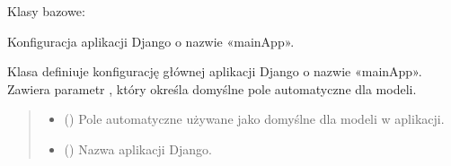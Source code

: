 \documentclass[letterpaper,10pt,polish]{sphinxmanual}
\begin{document}
\begin{fulllineitems}
\label{\detokenize{mainApp:mainApp.apps.MainappConfig}}
\pysigstartsignatures
{}
\pysigstopsignatures
\sphinxAtStartPar
Klasy bazowe: 

\sphinxAtStartPar
Konfiguracja aplikacji Django o nazwie «mainApp».

\sphinxAtStartPar
Klasa  definiuje konfigurację głównej aplikacji Django o nazwie «mainApp».
Zawiera parametr , który określa domyślne pole automatyczne dla modeli.
\begin{quote}\begin{description}
\begin{itemize}
\item {} 
\sphinxAtStartPar
{} () \textendash{} Pole automatyczne używane jako domyślne dla modeli w aplikacji.

\item {} 
\sphinxAtStartPar
{} () \textendash{} Nazwa aplikacji Django.

\end{itemize}

\end{description}\end{quote}

\begin{fulllineitems}
\label{\detokenize{mainApp:mainApp.apps.MainappConfig.default_auto_field}}
\pysigstartsignatures
{}
\pysigstopsignatures
\end{fulllineitems}


\begin{fulllineitems}
\label{\detokenize{mainApp:mainApp.apps.MainappConfig.name}}
\pysigstartsignatures
{}
\pysigstopsignatures
\end{fulllineitems}


\end{fulllineitems}
\end{document}
